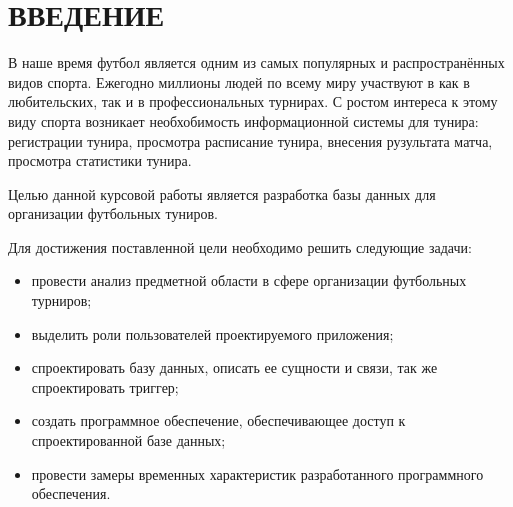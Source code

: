 \section*{\centering ВВЕДЕНИЕ}

В наше время футбол является одним из самых популярных и распространённых видов спорта.
Ежегодно миллионы людей по всему миру участвуют в как в любительских, так и в профессиональных турнирах.
С ростом интереса к этому виду спорта возникает необхобимость информационной системы для тунира: регистрации тунира, просмотра расписание тунира, внесения рузультата матча, просмотра статистики тунира.

Целью данной курсовой работы является разработка базы данных для организации футбольных туниров.

Для достижения поставленной цели необходимо решить следующие задачи:
\begin{itemize}
	\item провести анализ предметной области в сфере организации футбольных турниров;
	\item выделить роли пользователей проектируемого приложения;
	\item спроектировать базу данных, описать ее сущности и связи, так же спроектировать триггер;
	\item создать программное обеспечение, обеспечивающее доступ к спроектированной базе данных;
	\item провести замеры временных характеристик разработанного программного обеспечения.  
\end{itemize}